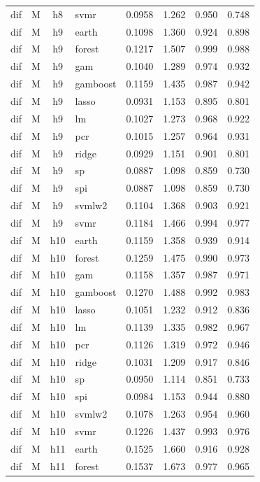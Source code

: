 \begin{ThreePartTable}
\begin{longtable}[t]{llclcccc}
dif & M & h8 & svmr & 0.0958 & 1.262 & 0.950 & 0.748\\
\addlinespace
dif & M & h9 & earth & 0.1098 & 1.360 & 0.924 & 0.898\\
dif & M & h9 & forest & 0.1217 & 1.507 & 0.999 & 0.988\\
dif & M & h9 & gam & 0.1040 & 1.289 & 0.974 & 0.932\\
dif & M & h9 & gamboost & 0.1159 & 1.435 & 0.987 & 0.942\\
dif & M & h9 & lasso & 0.0931 & 1.153 & 0.895 & 0.801\\
dif & M & h9 & lm & 0.1027 & 1.273 & 0.968 & 0.922\\
dif & M & h9 & pcr & 0.1015 & 1.257 & 0.964 & 0.931\\
dif & M & h9 & ridge & 0.0929 & 1.151 & 0.901 & 0.801\\
dif & M & h9 & sp & 0.0887 & 1.098 & 0.859 & 0.730\\
dif & M & h9 & spi & 0.0887 & 1.098 & 0.859 & 0.730\\
dif & M & h9 & svmlw2 & 0.1104 & 1.368 & 0.903 & 0.921\\
dif & M & h9 & svmr & 0.1184 & 1.466 & 0.994 & 0.977\\
\addlinespace
dif & M & h10 & earth & 0.1159 & 1.358 & 0.939 & 0.914\\
dif & M & h10 & forest & 0.1259 & 1.475 & 0.990 & 0.973\\
dif & M & h10 & gam & 0.1158 & 1.357 & 0.987 & 0.971\\
dif & M & h10 & gamboost & 0.1270 & 1.488 & 0.992 & 0.983\\
dif & M & h10 & lasso & 0.1051 & 1.232 & 0.912 & 0.836\\
dif & M & h10 & lm & 0.1139 & 1.335 & 0.982 & 0.967\\
dif & M & h10 & pcr & 0.1126 & 1.319 & 0.972 & 0.946\\
dif & M & h10 & ridge & 0.1031 & 1.209 & 0.917 & 0.846\\
dif & M & h10 & sp & 0.0950 & 1.114 & 0.851 & 0.733\\
dif & M & h10 & spi & 0.0984 & 1.153 & 0.944 & 0.880\\
dif & M & h10 & svmlw2 & 0.1078 & 1.263 & 0.954 & 0.960\\
dif & M & h10 & svmr & 0.1226 & 1.437 & 0.993 & 0.976\\
\addlinespace
dif & M & h11 & earth & 0.1525 & 1.660 & 0.916 & 0.928\\
dif & M & h11 & forest & 0.1537 & 1.673 & 0.977 & 0.965\\

\end{longtable}
\end{ThreePartTable}
